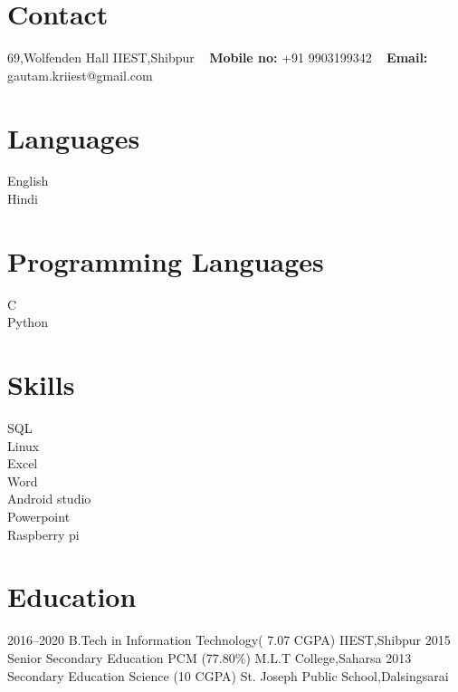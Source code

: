 \documentclass[]{cv-style}          %
\begin{document}
\lastupdated


\begin{aside}
%
\section{Contact}
69,Wolfenden Hall
IIEST,Shibpur
~
\textbf{Mobile no:}
+91 9903199342
~
\textbf{Email:}
gautam.kriiest@gmail.com
%
\section{Languages}
English\\
Hindi
%
\section{Programming
   Languages}
C\\
Python
%
\section{Skills}
SQL\\Linux\\Excel\\Word\\Android studio\\Powerpoint\\Raspberry pi
%
\end{aside}



\section{Education}

\begin{entrylist}
\entry
{2016--2020}
{B.Tech {\normalfont in Information Technology( 7.07 CGPA)}}
{IIEST,Shibpur}
{\vspace{-0.3cm}}
\entry
{2015}
{Senior Secondary Education {\normalfont PCM (77.80\%)}}
{M.L.T College,Saharsa}
{\vspace{-0.3cm}}
\entry
{2013}
{Secondary Education  {\normalfont Science (10 CGPA)}}
{St. Joseph Public School,Dalsingsarai}
{}
\end{entrylist}
\end{document}

